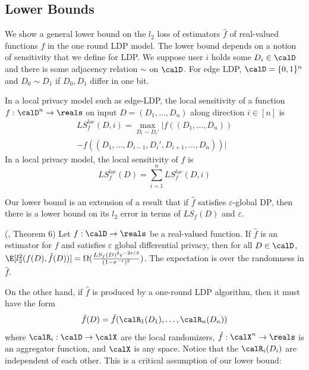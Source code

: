 \subsection{Lower Bounds}
\label{chap1-sub:lower_bounds}
We show a general lower bound on the $l_2$ loss of estimators $\hat{f}$ of
real-valued
functions $f$ in the one round LDP model. The lower bound depends on a notion of
sensitivity that we define for LDP. We suppose user $i$ holds some $D_i \in
\calD$ and there is some adjacency relation $\sim$ on $\calD$. For edge LDP, 
$\calD = \{0,1\}^n$ and $D_0 \sim D_1$ if $D_0,D_1$ differ in one bit.
\begin{definition}\label{chap1-def:lmodel-sens}
  In a local privacy model such as edge-LDP,
  the local sensitivity of a function $f : \calD^n
  \rightarrow \reals$ on input $D = (D_1, \ldots, D_n)$ along direction $i \in
  [n]$ is
  \begin{multline*}
    LS^{loc}_f(D, i) = \max_{D_i \sim D_i'} |f(
  (D_1, \ldots, D_n)) \\ - f((D_1, \ldots,
  D_{i-1}, D_i', D_{i+1}, \ldots, D_n))|
  \end{multline*}
  In a local privacy model, the local sensitivity of $f$ is
  \begin{equation*}
    LS^{loc}_f(D) = \sum_{i=1}^n LS^{loc}_f(D,i)
  \end{equation*}
\end{definition}

Our lower bound is an extension of a result that if $\hat{f}$ satisfies
$\varepsilon$-global DP, then there is a lower bound on its $l_2$ error in terms
of $LS_f(D)$ and $\varepsilon$.

\begin{theorem}
  \label{chap1-thm:lb-global}
  (\cite{}, Theorem 6)
  Let $f : \calD \rightarrow \reals$ be a real-valued function. If $\hat{f}$ is
  an estimator for $f$ and satisfies $\varepsilon$ global differential privacy, then 
  for all $D \in \calD$,
  $\E[l_2^2(f(D), \hat{f}(D))] = \Omega(\frac{LS_f(D)^2 e^{-2\varepsilon/3
  }}{(1-e^{-\varepsilon})^2})$.
  The expectation is over the randomness in $\hat{f}$.
\end{theorem}

On the other hand,
if $\hat{f}$ is produced by a one-round LDP algorithm, then it must have the
form
\[
  \hat{f}(D) = \tilde{f}(\calR_1(D_1), \ldots, \calR_n(D_n))
\]
where $\calR_i : \calD \rightarrow \calX$ are the local randomizers, $\tilde{f}
: \calX^n \rightarrow \reals$ is an aggregator function, and $\calX$ is any
space. Notice that the $\calR_i(D_i)$ are independent of each other.
This is a critical assumption of our lower bound:

